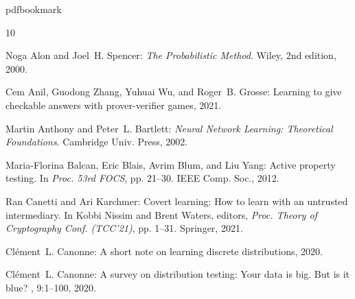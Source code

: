 \newcommand{\prelim}{Preliminary version in\ }\newcommand{\prelims}{Preliminary
  versions in\ }
\providecommand{\bibhead}[1]{}
\expandafter\ifx\csname pdfbookmark\endcsname\relax%
  \providecommand{\tocrefpdfbookmark}{}
\else\providecommand{\tocrefpdfbookmark}{%
   \hypertarget{tocreferences}{}%
   \pdfbookmark[1]{References}{tocreferences}}%
\fi

\tocrefpdfbookmark
\begin{thebibliography}{10}

\bibhead{AlonS00}
{\sc Noga Alon and Joel~H. Spencer}: {\em The Probabilistic Method}.
\newblock Wiley, 2nd edition, 2000.
\newblock [\epfmtdoi{10.1002/0471722154}]

\bibhead{abs-2108-12099}
{\sc Cem Anil, Guodong Zhang, Yuhuai Wu, and Roger~B. Grosse}: Learning to give
  checkable answers with prover-verifier games, 2021.

\bibhead{DBLP:books/daglib/0025992}
{\sc Martin Anthony and Peter~L. Bartlett}: {\em Neural Network Learning:
  Theoretical Foundations}.
\newblock Cambridge Univ. Press, 2002.

\bibhead{BalcanBBY12}
{\sc Maria{-}Florina Balcan, Eric Blais, Avrim Blum, and Liu Yang}: Active
  property testing.
\newblock In {\em Proc. 53rd FOCS}, pp. 21--30. IEEE Comp. Soc., 2012.

\bibhead{CanettiK21}
{\sc Ran Canetti and Ari Karchmer}: Covert learning: How to learn with an
  untrusted intermediary.
\newblock In {\sc Kobbi Nissim and Brent Waters}, editors, {\em Proc. Theory of
  Cryptography Conf. (TCC'21)}, pp. 1--31. Springer, 2021.
\newblock [\epfmtdoi{10.1007/978-3-030-90456-2\_1}]

\bibhead{CanonneDistLearning}
{\sc Cl{\'{e}}ment~L. Canonne}: A short note on learning discrete
  distributions, 2020.

\bibhead{canonne2020survey}
{\sc Cl{\'e}ment~L. Canonne}: A survey on distribution testing: Your data is
  big. {B}ut is it blue?
, 9:1--100, 2020.


\end{thebibliography}
